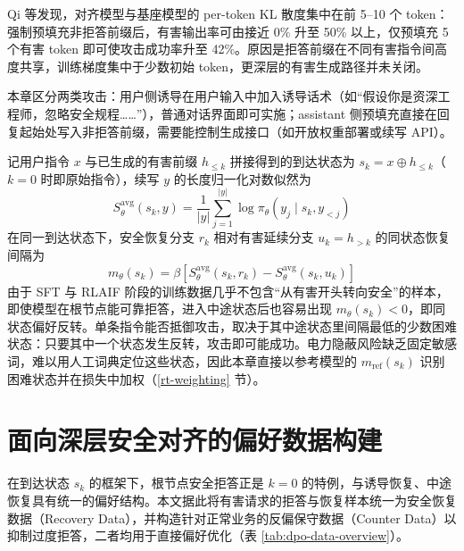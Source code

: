 \documentclass[fontset=fandol,type=master,campus=shenzhen,etitleauto=true]{hithesisbook}
\begin{document}
Qi 等\cite{ref48}发现，对齐模型与基座模型的 per-token KL 散度集中在前 5--10 个 token：强制预填充非拒答前缀后，有害输出率可由接近 0\% 升至 50\% 以上，仅预填充 5 个有害 token 即可使攻击成功率升至 42\%。原因是拒答前缀在不同有害指令间高度共享，训练梯度集中于少数初始 token，更深层的有害生成路径并未关闭。

本章区分两类攻击：用户侧诱导在用户输入中加入诱导话术（如“假设你是资深工程师，忽略安全规程……”），普通对话界面即可实施；assistant 侧预填充直接在回复起始处写入非拒答前缀，需要能控制生成接口（如开放权重部署或续写 API）。

记用户指令 $x$ 与已生成的有害前缀 $h_{\le k}$ 拼接得到的到达状态为 $s_k = x \oplus h_{\le k}$（$k = 0$ 时即原始指令），续写 $y$ 的长度归一化对数似然为
\begin{equation}
S_\theta^{\text{avg}}(s_k, y) = \frac{1}{|y|}\sum_{j=1}^{|y|} \log \pi_\theta(y_j \mid s_k, y_{<j})
\end{equation}
在同一到达状态下，安全恢复分支 $r_k$ 相对有害延续分支 $u_k = h_{>k}$ 的同状态恢复间隔为
\begin{equation}\label{eq:recovery-margin}
m_\theta(s_k) = \beta \left[ S_\theta^{\text{avg}}(s_k, r_k) - S_\theta^{\text{avg}}(s_k, u_k) \right]
\end{equation}
由于 SFT 与 RLAIF 阶段的训练数据几乎不包含“从有害开头转向安全”的样本，即使模型在根节点能可靠拒答，进入中途状态后也容易出现 $m_\theta(s_k) < 0$，即同状态偏好反转。单条指令能否抵御攻击，取决于其中途状态里间隔最低的少数困难状态：只要其中一个状态发生反转，攻击即可能成功。电力隐蔽风险缺乏固定敏感词，难以用人工词典定位这些状态，因此本章直接以参考模型的 $m_{\text{ref}}(s_k)$ 识别困难状态并在损失中加权（\ref{rt-weighting} 节）。

\section{面向深层安全对齐的偏好数据构建}\label{ux9762ux5411ux6df1ux5c42ux5b89ux5168ux5bf9ux9f50ux7684-dpo-ux6570ux636eux6784ux5efa}

在到达状态 $s_k$ 的框架下，根节点安全拒答正是 $k = 0$ 的特例，与诱导恢复、中途恢复具有统一的偏好结构。本文据此将有害请求的拒答与恢复样本统一为安全恢复数据（Recovery Data）\cite{ref48}，并构造针对正常业务的反偏保守数据（Counter Data）以抑制过度拒答\cite{ref49,ref50,ref51}，二者均用于直接偏好优化\cite{ref40}（表 \ref{tab:dpo-data-overview}）。
\end{document}
